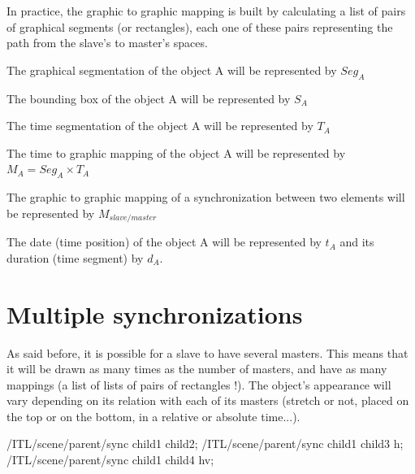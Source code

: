 \documentclass[a4paper]{article}
\newenvironment{inscore}	{\vspace{-2mm}\small\verbatim}{\endverbatim\vspace{-2mm}}
\begin{document}
In practice, the graphic to graphic mapping is built by calculating a list of pairs of graphical segments (or rectangles), each one of these pairs representing the path from the slave's to master's spaces.

\bigskip

The graphical segmentation of the object A will be represented by $Seg_A$


The bounding box of the object A will be represented by $S_A$

The time segmentation of the object A will be represented by $T_A$

The time to graphic mapping of the object A will be represented by $M_A = Seg_A \times T_A$

The graphic to graphic mapping of a synchronization between two elements will be represented by $M_{slave/master}$

The date (time position) of the object A will be represented by $t_A$ and its duration (time segment) by $d_A$.



\section{Multiple synchronizations}\label{sec:multSync}

As said before, it is possible for a slave to have several masters. This means that it will be drawn as many times as the number of masters, and have as many mappings (a list of lists of pairs of rectangles !). The object's appearance will vary depending on its relation with each of its masters (stretch or not, placed on the top or on the bottom, in a relative or absolute time...).

\begin{inscore}
/ITL/scene/parent/sync child1 child2;
/ITL/scene/parent/sync child1 child3 h;
/ITL/scene/parent/sync child1 child4 hv;
\end{inscore}

\end{document}
